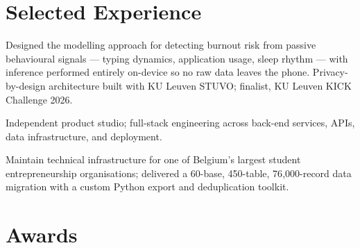 \section{Selected Experience}

\begin{bullets}
    \item Designed the modelling approach for detecting burnout risk from passive behavioural signals --- typing dynamics, application usage, sleep rhythm --- with inference performed entirely on-device so no raw data leaves the phone. Privacy-by-design architecture built with KU Leuven STUVO; finalist, KU Leuven KICK Challenge 2026.
\end{bullets}

\begin{bullets}
    \item Independent product studio; full-stack engineering across back-end services, APIs, data infrastructure, and deployment.
\end{bullets}

\begin{bullets}
    \item Maintain technical infrastructure for one of Belgium's largest student entrepreneurship organisations; delivered a 60-base, 450-table, 76{,}000-record data migration with a custom Python export and deduplication toolkit.
\end{bullets}

\section{Awards}


\vspace{4pt}
